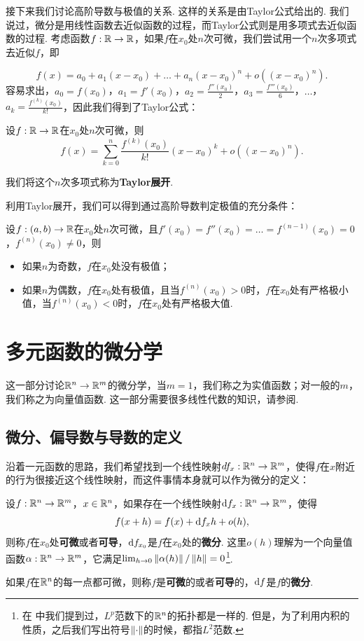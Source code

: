 接下来我们讨论高阶导数与极值的关系. 这样的关系是由Taylor公式给出的. 我们说过，微分是用线性函数去近似函数的过程，而Taylor公式则是用多项式去近似函数的过程. 考虑函数$f:\mathbb{R}\to\mathbb{R}$，如果$f$在$x_0$处$n$次可微，我们尝试用一个$n$次多项式去近似$f$，即

\[
    f(x)=a_0+a_1(x-x_0)+\dots+a_n(x-x_0)^n+o((x-x_0)^n).
\]
容易求出，$a_0=f(x_0)$，$a_1=f'(x_0)$，$a_2=\frac{f''(x_0)}{2}$，$a_3=\frac{f'''(x_0)}{6}$，$\dots$，$a_k=\frac{f^{(k)}(x_0)}{k!}$，因此我们得到了Taylor公式：

\begin{theorem}
    设$f:\mathbb{R}\to\mathbb{R}$在$x_0$处$n$次可微，则
    \[
        f(x)=\sum_{k=0}^n\frac{f^{(k)}(x_0)}{k!}(x-x_0)^k+o((x-x_0)^n).
    \]
\end{theorem}

我们将这个$n$次多项式称为\textbf{Taylor展开}.

利用Taylor展开，我们可以得到通过高阶导数判定极值的充分条件：

\begin{theorem}\label{theorem:extreme}
    设$f:(a,b)\to\mathbb{R}$在$x_0$处$n$次可微，且$f'(x_0)=f''(x_0)=\dots=f^{(n-1)}(x_0)=0$，$f^{(n)}(x_0)\neq 0$，则
    \begin{itemize}
        \item 如果$n$为奇数，$f$在$x_0$处没有极值；
        \item 如果$n$为偶数，$f$在$x_0$处有极值，且当$f^{(n)}(x_0)>0$时，$f$在$x_0$处有严格极小值，当$f^{(n)}(x_0)<0$时，$f$在$x_0$处有严格极大值.
    \end{itemize}
\end{theorem}

\section{多元函数的微分学}

这一部分讨论$\mathbb{R}^n\to\mathbb{R}^m$的微分学，当$m=1$，我们称之为实值函数；对一般的$m$，我们称之为向量值函数. 这一部分需要很多线性代数的知识，请参阅.

\subsection{微分、偏导数与导数的定义}\label{subsec:partial-derivative}

沿着一元函数的思路，我们希望找到一个线性映射$df_x:\mathbb{R}^n\to\mathbb{R}^m$，使得$f$在$x$附近的行为很接近这个线性映射，而这件事情本身就可以作为微分的定义：

\begin{definition}[微分]
    设$f:\mathbb{R}^n\to\mathbb{R}^m$，$x\in\mathbb{R}^n$，如果存在一个线性映射$\mathrm{d} f_{x}:\mathbb{R}^n\to\mathbb{R}^m$，使得
    \[
        f(x+h)=f(x)+\mathrm{d} f_{x}h+o(h),
    \]
    则称$f$在$x_0$处\textbf{可微}或者\textbf{可导}，$\mathrm{d} f_{x_0}$是$f$在$x_0$处的\textbf{微分}. 这里$o(h)$理解为一个向量值函数$\alpha:\mathbb{R}^n\to\mathbb{R}^m$，它满足$\lim_{h\to 0}\left\|\alpha(h)\right\|/\left\|h\right\|=0$\footnote{在 中我们提到过，$L^p$范数下的$\mathbb{R}^n$的拓扑都是一样的. 但是，为了利用内积的性质，之后我们写出符号$\left\|\cdot\right\|$的时候，都指$L^2$范数.}.

    如果$f$在$\mathbb{R}^n$的每一点都可微，则称$f$是\textbf{可微}的或者\textbf{可导}的，$\mathrm{d} f$是$f$的\textbf{微分}.
\end{definition}

